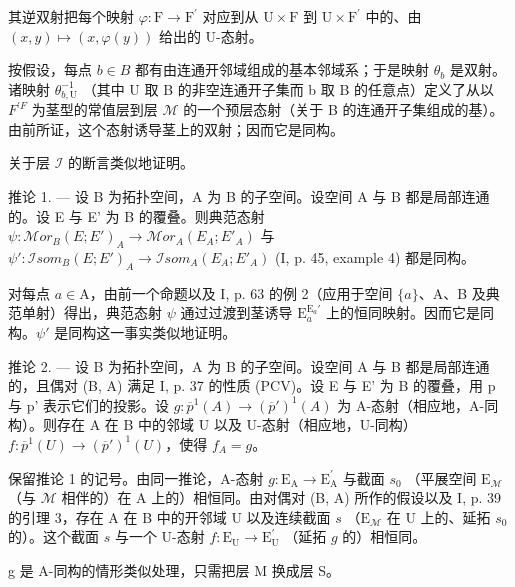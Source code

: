 其逆双射把每个映射 \(\varphi\colon\mathrm{F}\to\mathrm{F}^{\prime}\) 对应到从 \(\mathrm{U}\times\mathrm{F}\) 到 \(\mathrm{U}\times\mathrm{F}^{\prime}\) 中的、由 \((x,y)\mapsto(x,\varphi(y))\) 给出的 U-态射。

按假设，每点 \(b \in B\) 都有由连通开邻域组成的基本邻域系；于是映射 \(\theta_{b}\) 是双射。诸映射 \(\theta_{b,\mathrm{U}}^{-1}\) （其中 U 取 B 的非空连通开子集而 b 取 B 的任意点）定义了从以 \(F^{\prime F}\) 为茎型的常值层到层 \(\mathcal{M}\) 的一个预层态射（关于 B 的连通开子集组成的基）。由前所证，这个态射诱导茎上的双射；因而它是同构。

关于层 \(\mathcal{I}\) 的断言类似地证明。

推论 1. --- 设 B 为拓扑空间，A 为 B 的子空间。设空间 A 与 B 都是局部连通的。设 E 与 E' 为 B 的覆叠。则典范态射 \(\psi\colon\mathcal{M}or_{B}(E;E')_{A}\to\mathcal{M}or_{A}(E_{A};E'_{A})\) 与 \(\psi'\colon\mathcal{I}som_{B}(E;E')_{A}\to\mathcal{I}som_{A}(E_{A};E'_{A})\) (I, p. 45, example 4) 都是同构。

对每点 \(a \in \mathrm{A}\)，由前一个命题以及 I, p. 63 的例 2（应用于空间 \(\{a\}\)、A、B 及典范单射）得出，典范态射 \(\psi\) 通过过渡到茎诱导 \(\mathrm{E}_a^{\mathrm{E}_a'}\) 上的恒同映射。因而它是同构。\(\psi'\) 是同构这一事实类似地证明。

推论 2. --- 设 B 为拓扑空间，A 为 B 的子空间。设空间 A 与 B 都是局部连通的，且偶对 (B, A) 满足 I, p. 37 的性质 (PCV)。设 E 与 E' 为 B 的覆叠，用 p 与 p' 表示它们的投影。设 \(g: \overline{p}^{1}(A) \to (\overline{p}')^{1}(A)\) 为 A-态射（相应地，A-同构）。则存在 A 在 B 中的邻域 U 以及 U-态射（相应地，U-同构）\(f: \overline{p}^{1}(U) \to (\overline{p}')^{1}(U)\)，使得 \(f_{A} = g\)。

保留推论 1 的记号。由同一推论，A-态射 \(g \colon \mathrm{E}_{\mathrm{A}} \to \mathrm{E}_{\mathrm{A}}^{\prime}\) 与截面 \(s_0\) （平展空间 \(\mathrm{E}_{\mathcal{M}}\) （与 \(\mathcal{M}\) 相伴的）在 A 上的）相恒同。由对偶对 (B, A) 所作的假设以及 I, p. 39 的引理 3，存在 A 在 B 中的开邻域 U 以及连续截面 \(s\) （\(\mathrm{E}_{\mathcal{M}}\) 在 U 上的、延拓 \(s_0\) 的）。这个截面 \(s\) 与一个 U-态射 \(f \colon \mathrm{E}_{\mathrm{U}} \to \mathrm{E}_{\mathrm{U}}^{\prime}\) （延拓 \(g\) 的）相恒同。

g 是 A-同构的情形类似处理，只需把层 M 换成层 S。

